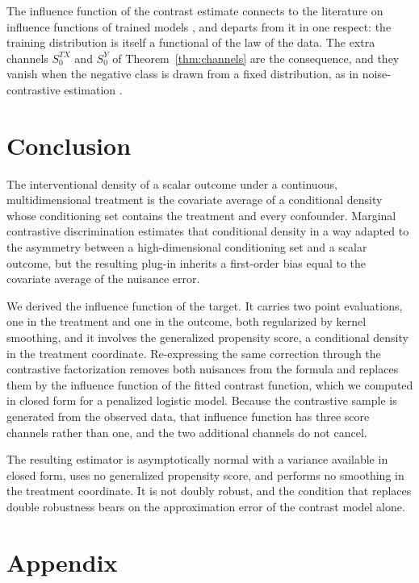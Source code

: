 \documentclass[11pt]{article}
\theoremstyle{plain}
\theoremstyle{definition}
\theoremstyle{remark}
\newcommand{\score}{S}
\begin{document}
The influence function of the contrast estimate connects to the literature on influence
functions of trained models \citep{avella2017,kohliang2017,basu2021,bae2022}, and departs from
it in one respect: the training distribution is itself a functional of the law of the data. The
extra channels $\score_0^{TX}$ and $\score_0^{Y}$ of Theorem~\ref{thm:channels} are the
consequence, and they vanish when the negative class is drawn from a fixed distribution, as in
noise-contrastive estimation \citep{gutmann2010nce}.

\section{Conclusion}
\label{sec:conclusion}

The interventional density of a scalar outcome under a continuous, multidimensional treatment
is the covariate average of a conditional density whose conditioning set contains the treatment
and every confounder. Marginal contrastive discrimination estimates that conditional density in
a way adapted to the asymmetry between a high-dimensional conditioning set and a scalar outcome,
but the resulting plug-in inherits a first-order bias equal to the covariate average of the
nuisance error.

We derived the influence function of the target. It carries two point evaluations, one in the
treatment and one in the outcome, both regularized by kernel smoothing, and it involves the
generalized propensity score, a conditional density in the treatment coordinate. Re-expressing
the same correction through the contrastive factorization removes both nuisances from the
formula and replaces them by the influence function of the fitted contrast function, which we
computed in closed form for a penalized logistic model. Because the contrastive sample is
generated from the observed data, that influence function has three score channels rather than
one, and the two additional channels do not cancel.

The resulting estimator is asymptotically normal with a variance available in closed form, uses
no generalized propensity score, and performs no smoothing in the treatment coordinate. It is
not doubly robust, and the condition that replaces double robustness bears on the approximation
error of the contrast model alone.




\clearpage
\appendix

\section*{Appendix}
\end{document}
